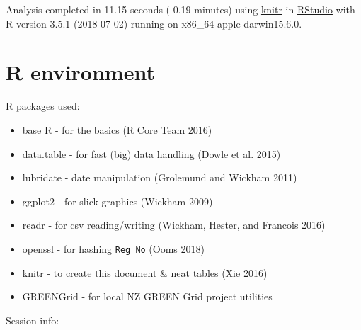 \documentclass[]{article}
\providecommand{\tightlist}{%
  \setlength{\itemsep}{0pt}\setlength{\parskip}{0pt}}
\begin{document}
Analysis completed in 11.15 seconds ( 0.19 minutes) using
\href{https://cran.r-project.org/package=knitr}{knitr} in
\href{http://www.rstudio.com}{RStudio} with R version 3.5.1 (2018-07-02)
running on x86\_64-apple-darwin15.6.0.

\section{R environment}\label{r-environment}

R packages used:

\begin{itemize}
\tightlist
\item
  base R - for the basics (R Core Team 2016)
\item
  data.table - for fast (big) data handling (Dowle et al. 2015)
\item
  lubridate - date manipulation (Grolemund and Wickham 2011)
\item
  ggplot2 - for slick graphics (Wickham 2009)
\item
  readr - for csv reading/writing (Wickham, Hester, and Francois 2016)
\item
  openssl - for hashing \texttt{Reg\ No} (Ooms 2018)
\item
  knitr - to create this document \& neat tables (Xie 2016)
\item
  GREENGrid - for local NZ GREEN Grid project utilities
\end{itemize}

Session info:
\end{document}
